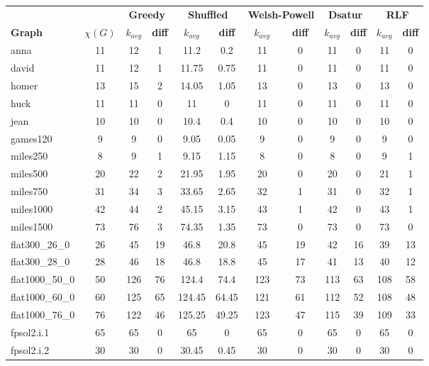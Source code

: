 \begin{longtable}{|>{\raggedright}p{2.3cm}|c|c|c|c|c|c|c|c|c|c|c|}
    \hline
     & & \multicolumn{2}{c|}{\textbf{Greedy}} & \multicolumn{2}{c|}{\textbf{Shuffled}} & \multicolumn{2}{c|}{\textbf{Welsh-Powell}} & \multicolumn{2}{c|}{\textbf{Dsatur}} & \multicolumn{2}{c|}{\textbf{RLF}} \\
     \textbf{Graph} & \textbf{$\chi(G)$} & \textbf{$k_{avg}$} & \textbf{diff} & \textbf{$k_{avg}$} & \textbf{diff} & \textbf{$k_{avg}$} & \textbf{diff} & \textbf{$k_{avg}$} & \textbf{diff} & \textbf{$k_{avg}$} & \textbf{diff} \\
    \hline
    anna & 11 & 12 & 1 & 11.2 & 0.2 & 11 & 0 & 11 & 0 & 11 & 0 \\
    david & 11 & 12 & 1 & 11.75 & 0.75 & 11 & 0 & 11 & 0 & 11 & 0 \\
    homer & 13 & 15 & 2 & 14.05 & 1.05 & 13 & 0 & 13 & 0 & 13 & 0 \\
    huck & 11 & 11 & 0 & 11 & 0 & 11 & 0 & 11 & 0 & 11 & 0 \\
    jean & 10 & 10 & 0 & 10.4 & 0.4 & 10 & 0 & 10 & 0 & 10 & 0 \\
    games120 & 9 & 9 & 0 & 9.05 & 0.05 & 9 & 0 & 9 & 0 & 9 & 0 \\
    miles250 & 8 & 9 & 1 & 9.15 & 1.15 & 8 & 0 & 8 & 0 & 9 & 1 \\
    miles500 & 20 & 22 & 2 & 21.95 & 1.95 & 20 & 0 & 20 & 0 & 21 & 1 \\
    miles750 & 31 & 34 & 3 & 33.65 & 2.65 & 32 & 1 & 31 & 0 & 32 & 1 \\
    miles1000 & 42 & 44 & 2 & 45.15 & 3.15 & 43 & 1 & 42 & 0 & 43 & 1 \\
    miles1500 & 73 & 76 & 3 & 74.35 & 1.35 & 73 & 0 & 73 & 0 & 73 & 0 \\
    flat300\_26\_0 & 26 & 45 & 19 & 46.8 & 20.8 & 45 & 19 & 42 & 16 & 39 & 13 \\
    flat300\_28\_0 & 28 & 46 & 18 & 46.8 & 18.8 & 45 & 17 & 41 & 13 & 40 & 12 \\
    flat1000\_50\_0 & 50 & 126 & 76 & 124.4 & 74.4 & 123 & 73 & 113 & 63 & 108 & 58 \\
    flat1000\_60\_0 & 60 & 125 & 65 & 124.45 & 64.45 & 121 & 61 & 112 & 52 & 108 & 48 \\
    flat1000\_76\_0 & 76 & 122 & 46 & 125.25 & 49.25 & 123 & 47 & 115 & 39 & 109 & 33 \\
    fpsol2.i.1 & 65 & 65 & 0 & 65 & 0 & 65 & 0 & 65 & 0 & 65 & 0 \\
    fpsol2.i.2 & 30 & 30 & 0 & 30.45 & 0.45 & 30 & 0 & 30 & 0 & 30 & 0 \\

\end{longtable}
